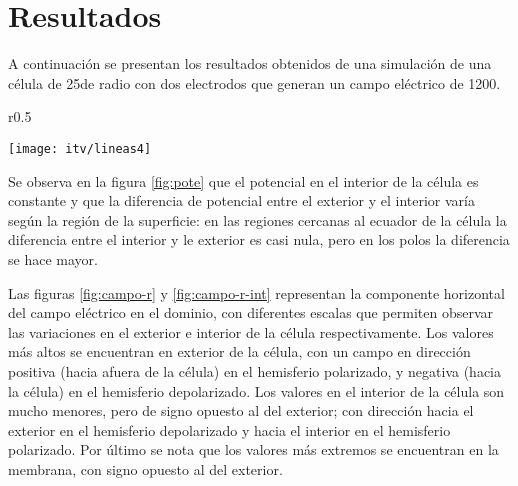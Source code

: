 
\newpage

\section{Resultados}
A continuación se presentan los resultados obtenidos de una simulación de una célula de 25\um de radio con dos electrodos que generan un campo eléctrico de 1200\vcm.\\



\begin{wrapfigure}{r}{0.5\textwidth}
  \begin{center}
    \texttt{[image: itv/lineas4]}
  \end{center}
  \caption{Potencial eléctrico en el dominio}
  \label{fig:pote}
\end{wrapfigure}

Se observa en la figura \ref{fig:pote} que el potencial en el interior de la célula es constante y que la diferencia de potencial entre el exterior y el interior varía según la región de la superficie: en las regiones cercanas al ecuador de la célula la diferencia entre el interior y le exterior es casi nula, pero en los polos la diferencia se hace mayor. 

Las figuras \ref{fig:campo-r} y \ref{fig:campo-r-int} representan la componente horizontal del campo eléctrico en el dominio, con diferentes escalas que permiten observar las variaciones en el exterior e interior de la célula respectivamente. Los valores más altos se encuentran en exterior de la célula, con un campo en dirección positiva (hacia afuera de la célula) en el hemisferio polarizado, y negativa (hacia la célula) en el hemisferio depolarizado. Los valores en el interior de la célula son mucho menores, pero de signo opuesto al del exterior; con dirección hacia el exterior en el hemisferio depolarizado y hacia el interior en el hemisferio polarizado. Por último se nota que los valores más extremos se encuentran en la membrana, con signo opuesto al del exterior. 

